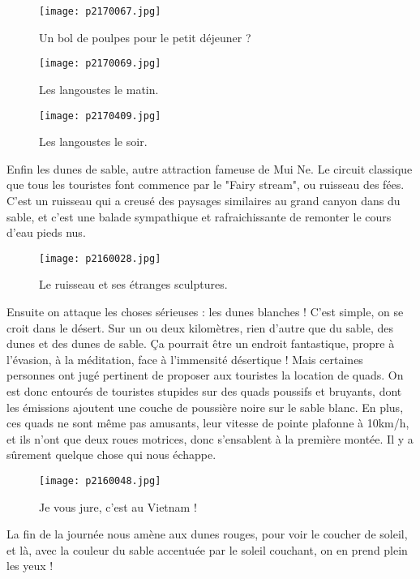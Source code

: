 \documentclass{book}
\begin{document}
\begin{figure}[h]
\centering
\texttt{[image: p2170067.jpg]}
\caption*{Un bol de poulpes pour le petit déjeuner ?}
\end{figure}


\begin{figure}[h]
\centering
\texttt{[image: p2170069.jpg]}
\caption*{Les langoustes le matin.}
\end{figure}


\begin{figure}[h]
\centering
\texttt{[image: p2170409.jpg]}
\caption*{Les langoustes le soir.}
\end{figure}

Enfin les dunes de sable, autre attraction fameuse de Mui Ne. Le circuit classique que tous les touristes font commence par le "Fairy stream", ou ruisseau des fées. C'est un ruisseau qui a creusé des paysages similaires au grand canyon dans du sable, et c'est une balade sympathique et rafraichissante de remonter le cours d'eau pieds nus.


\begin{figure}[h]
\centering
\texttt{[image: p2160028.jpg]}
\caption*{Le ruisseau et ses étranges sculptures.}
\end{figure}

Ensuite on attaque les choses sérieuses : les dunes blanches ! C'est simple, on se croit dans le désert. Sur un ou deux kilomètres, rien d'autre que du sable, des dunes et des dunes de sable. Ça pourrait être un endroit fantastique, propre à l'évasion, à la méditation, face à l'immensité désertique ! Mais certaines personnes ont jugé pertinent de proposer aux touristes la location de quads. On est donc entourés de touristes stupides sur des quads poussifs et bruyants, dont les émissions ajoutent une couche de poussière noire sur le sable blanc. En plus, ces quads ne sont même pas amusants, leur vitesse de pointe plafonne à 10km/h, et ils n'ont que deux roues motrices, donc s'ensablent à la première montée. Il y a sûrement quelque chose qui nous échappe.


\begin{figure}[h]
\centering
\texttt{[image: p2160048.jpg]}
\caption*{Je vous jure, c'est au Vietnam !}
\end{figure}

La fin de la journée nous amène aux dunes rouges, pour voir le coucher de soleil, et là, avec la couleur du sable accentuée par le soleil couchant, on en prend plein les yeux !
\end{document}
